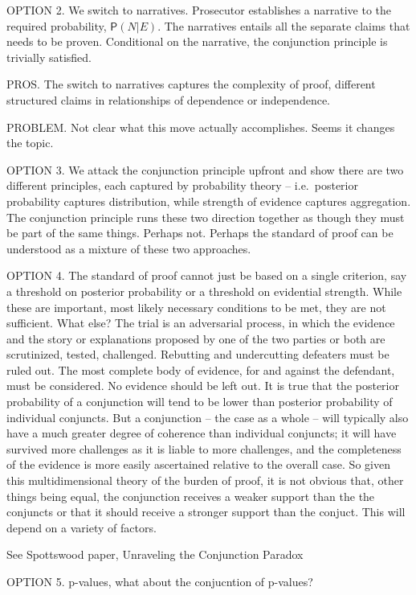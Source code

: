 \documentclass[
  10pt,
  dvipsnames,enabledeprecatedfontcommands]{scrartcl}
\newcommand{\pr}[1]{\mathsf{P}(#1)}
\begin{document}
OPTION 2. We switch to narratives. Prosecutor establishes a narrative to
the required probability, \(\pr{N \vert E}\). The narratives entails all
the separate claims that needs to be proven. Conditional on the
narrative, the conjunction principle is trivially satisfied.

PROS. The switch to narratives captures the complexity of proof,
different structured claims in relationships of dependence or
independence.

PROBLEM. Not clear what this move actually accomplishes. Seems it
changes the topic.

OPTION 3. We attack the conjunction principle upfront and show there are
two different principles, each captured by probability theory --
i.e.~posterior probability captures distribution, while strength of
evidence captures aggregation. The conjunction principle runs these two
direction together as though they must be part of the same things.
Perhaps not. Perhaps the standard of proof can be understood as a
mixture of these two approaches.

OPTION 4. The standard of proof cannot just be based on a single
criterion, say a threshold on posterior probability or a threshold on
evidential strength. While these are important, most likely necessary
conditions to be met, they are not sufficient. What else? The trial is
an adversarial process, in which the evidence and the story or
explanations proposed by one of the two parties or both are scrutinized,
tested, challenged. Rebutting and undercutting defeaters must be ruled
out. The most complete body of evidence, for and against the defendant,
must be considered. No evidence should be left out. It is true that the
posterior probability of a conjunction will tend to be lower than
posterior probability of individual conjuncts. But a conjunction -- the
case as a whole -- will typically also have a much greater degree of
coherence than individual conjuncts; it will have survived more
challenges as it is liable to more challenges, and the completeness of
the evidence is more easily ascertained relative to the overall case. So
given this multidimensional theory of the burden of proof, it is not
obvious that, other things being equal, the conjunction receives a
weaker support than the the conjuncts or that it should receive a
stronger support than the conjuct. This will depend on a variety of
factors.

See Spottswood paper, Unraveling the Conjunction Paradox

OPTION 5. p-values, what about the conjucntion of p-values?
\end{document}
